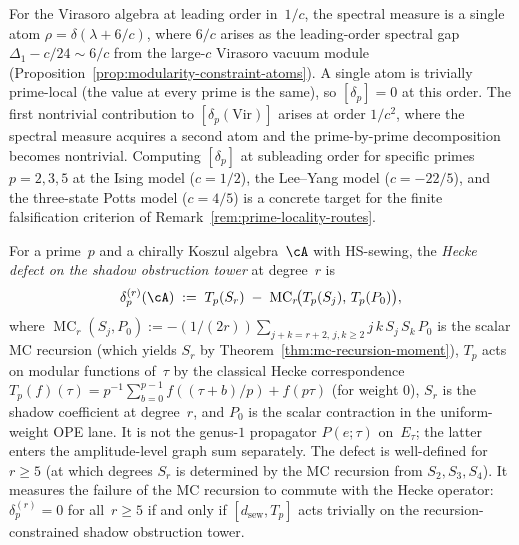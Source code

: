 \begin{remark}%
\label{rem:hecke-defect-leading}%
%
For the Virasoro algebra at leading order in~$1/c$,
the spectral measure is a single atom
$\rho = \delta(\lambda + 6/c)$,
where $6/c$ arises as the leading-order spectral gap
$\Delta_1 - c/24 \sim 6/c$ from the large-$c$ Virasoro
vacuum module
(Proposition~\ref{prop:modularity-constraint-atoms}).
A single atom is trivially prime-local (the value at every
prime is the same), so $[\delta_p] = 0$ at this order.
The first nontrivial contribution to $[\delta_p(\mathrm{Vir})]$
arises at order $1/c^2$, where the spectral measure acquires
a second atom and the prime-by-prime decomposition becomes
nontrivial. Computing $[\delta_p]$ at subleading order
for specific primes $p = 2, 3, 5$ at the Ising model
($c = 1/2$), the Lee--Yang model ($c = -22/5$), and the
three-state Potts model ($c = 4/5$) is a concrete target
for the finite falsification criterion of
Remark~\ref{rem:prime-locality-routes}.
\end{remark}

\begin{definition}%
\label{def:hecke-defect-shadow}%
%
For a prime~$p$ and a chirally Koszul algebra~$\cA$ with
HS-sewing, the \emph{Hecke defect on the shadow obstruction tower}
at degree~$r$ is
\begin{equation}\label{eq:hecke-defect-degree}
 \delta_p^{(r)}(\cA)
 \;:=\;
 T_p(S_r) \;-\;
 \operatorname{MC}_r\!\bigl(T_p(S_j),\, T_p(P_0)\bigr),
\end{equation}
where $\operatorname{MC}_r(S_j, P_0) := -(1/(2r))
\sum_{j+k=r+2,\,
j,k \ge 2} j\,k\,S_j\,S_k\,P_0$ is the scalar MC recursion
\textup{(}which yields $S_r$ by
Theorem~\textup{\ref{thm:mc-recursion-moment}}\textup{)},
$T_p$ acts on modular functions of~$\tau$ by the
classical Hecke correspondence
$T_p(f)(\tau) = p^{-1}\sum_{b=0}^{p-1} f((\tau{+}b)/p)
+ f(p\tau)$ \textup{(}for weight $0$\textup{)}, $S_r$ is
the shadow coefficient at degree~$r$, and $P_0$ is the
scalar contraction in the uniform-weight OPE lane. It is not
the genus-$1$ propagator $P(e;\tau)$ on~$E_\tau$; the latter
enters the amplitude-level graph sum separately. The defect is
well-defined
for $r \ge 5$ \textup{(}at which degrees
$S_r$ is determined by the MC recursion from
$S_2, S_3, S_4$\textup{)}. It measures the failure
of the MC recursion to commute with the Hecke operator:
$\delta_p^{(r)} = 0$ for all~$r \ge 5$ if and only if
$[d_{\mathrm{sew}}, T_p]$ acts trivially on the
recursion-constrained shadow obstruction tower.
\end{definition}

